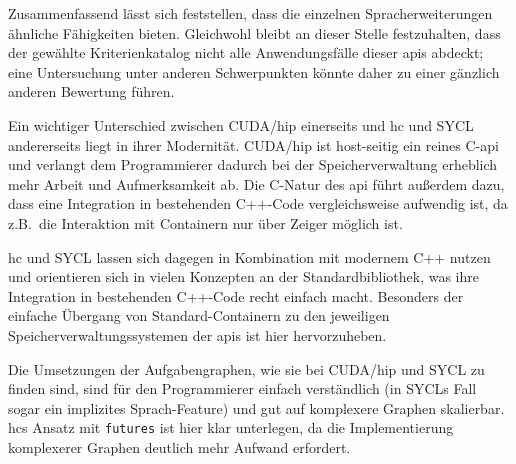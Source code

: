 Zusammenfassend lässt sich feststellen, dass die einzelnen Spracherweiterungen
ähnliche Fähigkeiten bieten. Gleichwohl bleibt an dieser Stelle festzuhalten,
dass der gewählte Kriterienkatalog nicht alle Anwendungsfälle dieser \gls{api}s
abdeckt; eine Untersuchung unter anderen Schwerpunkten könnte daher zu einer
gänzlich anderen Bewertung führen.

Ein wichtiger Unterschied zwischen CUDA/\gls{hip} einerseits und \gls{hc} und
SYCL andererseits liegt in ihrer Modernität. CUDA/\gls{hip} ist host-seitig ein
reines C-\gls{api} und verlangt dem Programmierer dadurch bei der
Speicherverwaltung erheblich mehr Arbeit und Aufmerksamkeit ab. Die C-Natur des
\gls{api} führt außerdem dazu, dass eine Integration in bestehenden C++-Code
vergleichsweise aufwendig ist, da z.B.\ die Interaktion mit Containern nur
über Zeiger möglich ist.

\gls{hc} und SYCL lassen sich dagegen in Kombination mit modernem C++ nutzen und
orientieren sich in vielen Konzepten an der Standardbibliothek, was ihre
Integration in bestehenden C++-Code recht einfach macht. Besonders der einfache
Übergang von Standard-Containern zu den jeweiligen Speicherverwaltungssystemen
der \gls{api}s ist hier hervorzuheben.

Die Umsetzungen der Aufgabengraphen, wie sie bei CUDA/\gls{hip} und SYCL zu
finden sind, sind für den Programmierer einfach verständlich (in SYCLs Fall
sogar ein implizites Sprach-Feature) und gut auf komplexere Graphen skalierbar.
\gls{hc}s Ansatz mit \texttt{futures} ist hier klar unterlegen, da die
Implementierung komplexerer Graphen deutlich mehr Aufwand erfordert.
